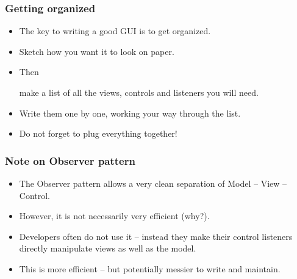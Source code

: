 \documentclass{beamer}
\def\mcolor#1#2{\rule{0ex}{0ex}\color{#1}#2\color{black}{}}
\begin{document}
\begin{frame}
  \frametitle{Getting organized}
\begin{itemize}
\item The key to writing a good GUI is to get organized.
\item \mcolor{blue}{Sketch how you want it to look on paper.}
\item Then \mcolor{blue}{make a list of all the views, controls and
    listeners} you will need.
\item Write them one by one, working your way through the list.
\item Do not forget to plug everything together!  
\end{itemize}
\end{frame}

\begin{frame}
  \frametitle{Note on Observer pattern}
\begin{itemize}
\item \mcolor{blue}{The Observer pattern allows a very clean
    separation of Model -- View -- Control.}
\item However, it is not necessarily very efficient (why?).
\item \mcolor{blue}{Developers often do not use it -- instead they
    make their control listeners directly manipulate views as well as
    the model.}
\item This is more efficient -- but potentially messier to write and
  maintain.
\end{itemize}
\end{frame}
\end{document}
